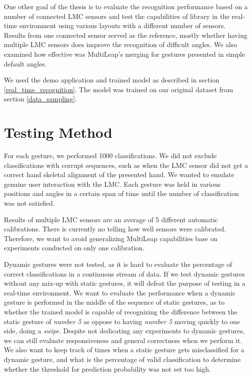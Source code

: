 
One other goal of the thesis is to evaluate the recognition performance based on a number of connected LMC sensors and test the capabilities of  library in the real-time environment using various layouts with a different number of sensors. Results from one connected sensor served as the reference, mostly whether having multiple LMC sensors does improve the recognition of difficult angles. We also examined how effective was MultiLeap's merging for gestures presented in simple default angles.

We used the demo application and trained model as described in section \ref{real_time_recognition}. The model was trained on our original dataset from section \ref{data_sampling}. 

\section{Testing Method}

For each gesture, we performed 1000 classifications. We did not exclude classifications with corrupt sequences, such as when the LMC sensor did not get a correct hand skeletal alignment of the presented hand. We wanted to emulate genuine user interaction with the LMC. Each gesture was held in various positions and angles in a certain span of time until the number of classification was not satisfied. 

Results of multiple LMC sensors are an average of 5 different automatic calibrations. There is currently no telling how well sensors were calibrated. Therefore, we want to avoid generalizing MultiLeap capabilities base on experiments conducted on only one calibration.

Dynamic gestures were not tested, as it is hard to evaluate the percentage of correct classifications in a continuous stream of data. If we test dynamic gestures without any mix-up with static gestures, it will defeat the purpose of testing in a real-time environment. We want to evaluate the performance when a dynamic gesture is performed in the middle of the sequence of static gestures, as to whether the trained model is capable of recognizing the difference between the static gesture of \textit{number 5} as oppose to having \textit{number 5} moving quickly to one side, doing a \textit{swipe}. Despite not dedicating any experiments to dynamic gestures, we can still evaluate responsiveness and general correctness when we perform it. We also want to keep track of times when a static gesture gets misclassified for a dynamic gesture, and what is the percentage of valid classification to determine whether the threshold for prediction probability was not set too high.


